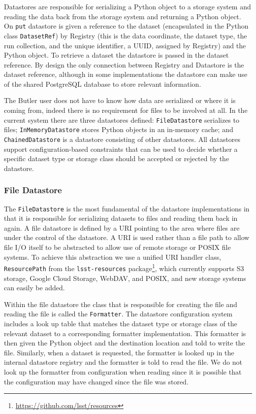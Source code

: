 \documentclass[]{spie}
\begin{document}
Datastores are responsible for serializing a Python object to a storage system and reading the data back from the storage system and returning a Python object.
On \texttt{put} datastore is given a reference to the dataset (encapsulated in the Python class \texttt{DatasetRef}) by Registry (this is the data coordinate, the dataset type, the run collection, and the unique identifier, a UUID, assigned by Registry) and the Python object.
To retrieve a dataset the datastore is passed in the dataset reference.
By design the only connection between Registry and Datastore is the dataset reference, although in some implementations the datastore can make use of the shared PostgreSQL database to store relevant information.

The Butler user does not have to know how data are serialized or where it is coming from, indeed there is no requirement for files to be involved at all.
In the current system there are three datastores defined: \texttt{FileDatastore} serializes to files; \texttt{InMemoryDatastore} stores Python objects in an in-memory cache; and \texttt{ChainedDatastore} is a datastore consisting of other datastores.
All datastores support configuration-based constraints that can be used to decide whether a specific dataset type or storage class should be accepted or rejected by the datastore.

\subsubsection{File Datastore}

The \texttt{FileDatastore} is the most fundamental of the datastore implementations in that it is responsible for serializing datasets to files and reading them back in again.
A file datastore is defined by a URI pointing to the area where files are under the control of the datastore.
A URI is used rather than a file path to allow file I/O itself to be abstracted to allow use of remote storage or POSIX file systems.
To achieve this abstraction we use a unified URI handler class, \texttt{ResourcePath} from the \texttt{lsst-resources} package\footnote{\url{https://github.com/lsst/resources}}, which currently supports S3 storage, Google Cloud Storage, WebDAV, and POSIX, and new storage systems can easily be added.

Within the file datastore the class that is responsible for creating the file and reading the file is called the \texttt{Formatter}.
The datastore configuration system includes a look up table that matches the dataset type or storage class of the relevant dataset to a corresponding formatter implementation.
This formatter is then given the Python object and the destination location and told to write the file.
Similarly, when a dataset is requested, the formatter is looked up in the internal datastore registry and the formatter is told to read the file.
We do not look up the formatter from configuration when reading since it is possible that the configuration may have changed since the file was stored.
\end{document}
